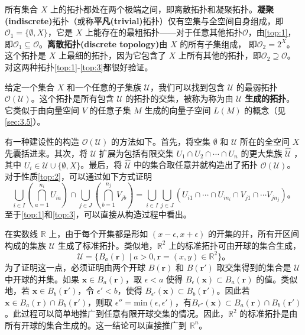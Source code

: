 \begin{eg}\label{eg:10.7}
	所有集合 $X$ 上的拓扑都处在两个极端之间，即离散拓扑和凝聚拓扑。\textbf{凝聚(indiscrete)}拓扑（或称\textbf{平凡(trivial)}拓扑）仅有空集与全空间自身组成，即$\mathcal{O}_{1} =\{\emptyset ,X\}$，它是 $X$ 上能存在的最粗拓扑——对于任意其他拓扑$\mathcal{O}$，由\ref{top:1}，即$\mathcal{O}_{1} \subseteq \mathcal{O}$。\textbf{离散拓扑(discrete topology)}由 $X$ 的所有子集组成， 即$\mathcal{O}_{2} =2^{X}$。这个拓扑是 $X$ 上最细的拓扑，因为它包含了 $X$ 上所有其他的拓扑，即$\mathcal{O}_{2} \supseteq \mathcal{O}$。对这两种拓扑\ref{top:1}-\ref{top:3}都很好验证。
\end{eg}

	给定一个集合 $X$ 和一个任意的子集族 $\mathcal{U}$，我们可以找到包含 $\mathcal{U}$ 的最弱拓扑 $\mathcal{O} (\mathcal{U} )$。这个拓扑是所有包含 $\mathcal{U}$ 的拓扑的交集，被称为称为由 $\mathcal{U}$ \textbf{生成的拓扑}。它类似于由向量空间 $V$ 的任意子集 $M$ 生成的向量子空间 $L(M)$ 的概念（见\ref{sec:3.5}）。

	有一种建设性的构造 $\mathcal{O} (\mathcal{U} )$ 的方法如下。首先，将空集 $\emptyset $ 和 $\mathcal{U}$ 所在的全空间 $X$ 先囊括进来。其次，将 $\mathcal{U}$ 扩展为包括有限交集 $U_{1} \cap U_{2} \cap \cdots \cap U_{n}$ 的更大集族 $\hat{\mathcal{U}}$ ，其中 $U_{i} \in \mathcal{U} \cup \{\emptyset ,X\}$。最后，将 $\hat{\mathcal{U}}$ 中的集合取任意并就构造出了拓扑 $\mathcal{O} (\mathcal{U} )$。对于性质\ref{top:2}，可以通过如下方式证明
\begin{equation*}
    \bigcup _{i\in I}\left(\bigcap _{a=1}^{n_{i}} U_{ia}\right) \cap \bigcup _{j\in J}\left(\bigcap _{b=1}^{n_{j}} V_{jb}\right) =\bigcup _{i\in I}\bigcup _{j\in J}( U_{i1} \cap \cdots \cap U_{in_{i}} \cap V_{j1} \cap \cdots V_{jn_{j}}) 。
\end{equation*}
至于\ref{top:1}和\ref{top:3}，可以直接从构造过程中看出。

\begin{eg}\label{eg:10.8}
	在实数线 $\mathbb{R}$ 上，由于每个开集都是形如 $(x-\epsilon ,x+\epsilon )$ 的开集的并，所有开区间构成的集族 $\mathcal{U}$ 生成了标准拓扑。类似地，$\mathbb{R}^{2}$ 上的标准拓扑可由开球的集合生成，
\begin{equation*}
    \mathcal{U} =\{B_{a} (\mathbf{r} )\mid a >0,\mathbf{r} =( x,y) \in \mathbb{R}^{2} \}。
\end{equation*}
为了证明这一点，必须证明由两个开球 $B(\mathbf{r} )$ 和 $B(\mathbf{r} ')$ 取交集得到的集合是 $\mathcal{U}$ 中开球的并集。如果 $\mathbf{x} \in B_{a} (\mathbf{r} )$，取 $\epsilon < a$ 使得 $B_{\epsilon } (\mathbf{x} )\subset B_{a} (\mathbf{r} )$ 的值。类似地，若 $\mathbf{x} \in B_{b} (\mathbf{r} ')$，令 $\epsilon '< b$，使得 $B_{\epsilon '} (\mathbf{x} )\subset B_{b} (\mathbf{r} ')$。因此若 $\mathbf{x} \in B_{a} (\mathbf{r} )\cap B_{b} (\mathbf{r} ')$，则取 $\epsilon ''=\mathrm{min}( \epsilon ,\epsilon ')$，有$B_{\epsilon ''} (\mathbf{x} )\subset B_{a} (\mathbf{r} )\cap B_{b} (\mathbf{r} ')$。此过程可以简单地推广到任意有限开球交集的情况。因此，$\mathbb{R}^{2}$ 的标准拓扑是由所有开球的集合生成的。这一结论可以直接推广到 $\mathbb{R}^{n}$。
\end{eg}

